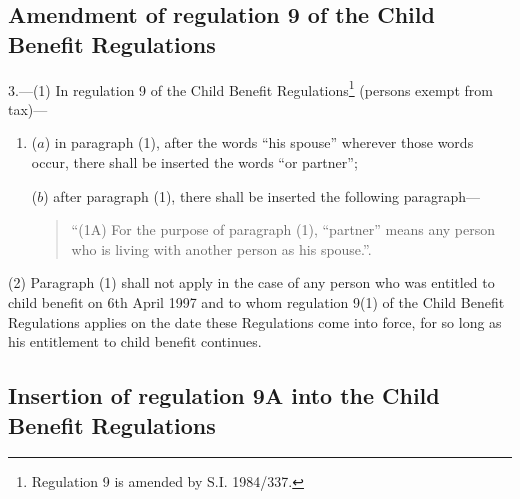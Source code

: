 \documentclass[12pt,a4paper]{article}
\begin{document}
\subsection[3. Amendment of regulation 9 of the Child Benefit Regulations]{Amendment of regulation 9 of the Child Benefit Regulations}

3.—(1) In regulation 9 of the Child Benefit Regulations\footnote{\frenchspacing Regulation 9 is amended by S.I. 1984/337.} (persons exempt from tax)—
\begin{enumerate}\item[]
($a$) in paragraph (1), after the words “his spouse” wherever those words occur, there shall be inserted the words “or partner”;

($b$) after paragraph (1), there shall be inserted the following paragraph—
\begin{quotation}
\begin{sloppypar}
“(1A) For the purpose of paragraph (1), “partner” means any person who is living with another person as his spouse.”.
\end{sloppypar}
\end{quotation}
\end{enumerate}

(2) Paragraph (1) shall not apply in the case of any person who was entitled to child benefit on 6th April 1997 and to whom regulation 9(1) of the Child Benefit Regulations applies on the date these Regulations come into force, for so long as his entitlement to child benefit continues.

\subsection[4. Insertion of regulation 9A into the Child Benefit Regulations]{Insertion of regulation 9A into the Child Benefit Regulations}
\end{document}
